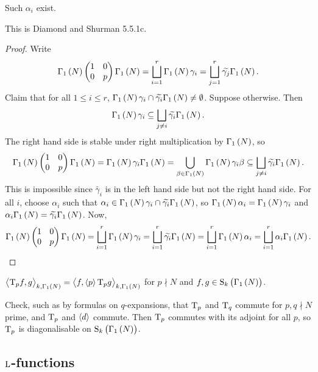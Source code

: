 \begin{lemma}
Such $ \alpha_i $ exist.
\end{lemma}

This is Diamond and Shurman 5.5.1c.

\begin{proof}
Write
$$ \Gamma_1\br{N}\twobytwo{1}{0}{0}{p}\Gamma_1\br{N} = \bigsqcup_{i = 1}^r \Gamma_1\br{N}\gamma_i = \bigsqcup_{j = 1}^r \widetilde{\gamma_j}\Gamma_1\br{N}. $$
Claim that for all $ 1 \le i \le r $, $ \Gamma_1\br{N}\gamma_i \cap \widetilde{\gamma_i}\Gamma_1\br{N} \ne \emptyset $. Suppose otherwise. Then
$$ \Gamma_1\br{N}\gamma_i \subseteq \bigsqcup_{j \ne i} \widetilde{\gamma_i}\Gamma_1\br{N}. $$
The right hand side is stable under right multiplication by $ \Gamma_1\br{N} $, so $  $
$$ \Gamma_1\br{N}\twobytwo{1}{0}{0}{p}\Gamma_1\br{N} = \Gamma_1\br{N}\gamma_i\Gamma_1\br{N} = \bigcup_{\beta \in \Gamma_1\br{N}} \Gamma_1\br{N}\gamma_i\beta \subseteq \bigsqcup_{j \ne i} \widetilde{\gamma_i}\Gamma_1\br{N}. $$
This is impossible since $ \widetilde{\gamma_i} $ is in the left hand side but not the right hand side. For all $ i $, choose $ \alpha_i $ such that $ \alpha_i \in \Gamma_1\br{N}\gamma_i \cap \widetilde{\gamma_i}\Gamma_1\br{N} $, so $ \Gamma_1\br{N}\alpha_i = \Gamma_1\br{N}\gamma_i $ and $ \alpha_i\Gamma_1\br{N} = \widetilde{\gamma_i}\Gamma_1\br{N} $. Now,
$$ \Gamma_1\br{N}\twobytwo{1}{0}{0}{p}\Gamma_1\br{N} = \bigsqcup_{i = 1}^r \Gamma_1\br{N}\gamma_i = \bigsqcup_{i = 1}^r \widetilde{\gamma_i}\Gamma_1\br{N} = \bigsqcup_{i = 1}^r \Gamma_1\br{N}\alpha_i = \bigsqcup_{i = 1}^r \alpha_i\Gamma_1\br{N}. $$
\end{proof}

\begin{corollary}
$ \abr{\T_pf, g}_{k, \Gamma_1\br{N}} = \abr{f, \abr{p}\T_pg}_{k, \Gamma_1\br{N}} $ for $ p \nmid N $ and $ f, g \in \S_k\br{\Gamma_1\br{N}} $.
\end{corollary}

Check, such as by formulas on $ q $-expansions, that $ \mathrm{T}_p $ and $ \mathrm{T}_q $ commute for $ p, q \nmid N $ prime, and $ \mathrm{T}_p $ and $ \left\langle d \right\rangle $ commute. Then $ \mathrm{T}_p $ commutes with its adjoint for all $ p $, so $ \mathrm{T}_p $ is diagonalisable on $ \S_k\br{\Gamma_1\br{N}} $.

\pagebreak

\subsection{\texorpdfstring{$ \mathrm{L} $}{L}-functions}

